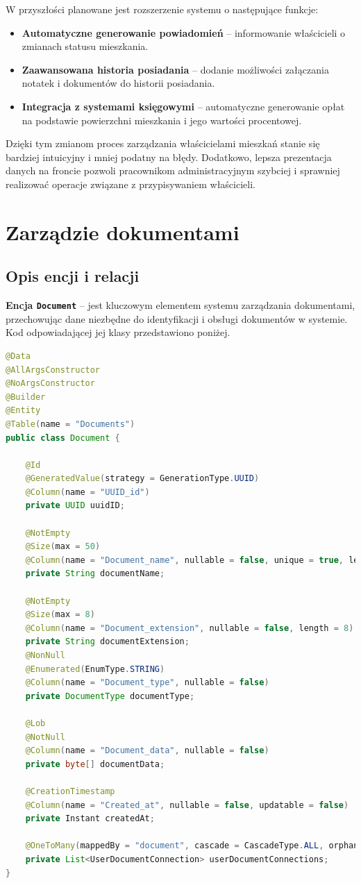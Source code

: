 W przyszłości planowane jest rozszerzenie systemu o następujące funkcje:
\begin{itemize}
    \item \textbf{Automatyczne generowanie powiadomień} -- informowanie właścicieli o zmianach statusu mieszkania.
    \item \textbf{Zaawansowana historia posiadania} -- dodanie możliwości załączania notatek i dokumentów do historii posiadania.
    \item \textbf{Integracja z systemami księgowymi} -- automatyczne generowanie opłat na podstawie powierzchni mieszkania i jego wartości procentowej.
\end{itemize}

Dzięki tym zmianom proces zarządzania właścicielami mieszkań stanie się bardziej intuicyjny i mniej podatny na błędy. Dodatkowo, lepsza prezentacja danych na froncie pozwoli pracownikom administracyjnym szybciej i sprawniej realizować operacje związane z przypisywaniem właścicieli.


\section{Zarządzie dokumentami}

\subsection{Opis encji i relacji}

\textbf{Encja \texttt{Document}}  -- jest kluczowym elementem systemu zarządzania dokumentami, przechowując dane niezbędne do identyfikacji i obsługi dokumentów w systemie. Kod odpowiadającej jej klasy przedstawiono poniżej.
\begin{lstlisting}[language=Java, style=JavaStyle, caption=Encja \texttt{Document}]
@Data
@AllArgsConstructor
@NoArgsConstructor
@Builder
@Entity
@Table(name = "Documents")
public class Document {

    @Id
    @GeneratedValue(strategy = GenerationType.UUID)
    @Column(name = "UUID_id")
    private UUID uuidID; 

    @NotEmpty
    @Size(max = 50)
    @Column(name = "Document_name", nullable = false, unique = true, length = 50)
    private String documentName; 

    @NotEmpty
    @Size(max = 8)
    @Column(name = "Document_extension", nullable = false, length = 8)
    private String documentExtension;
    @NonNull
    @Enumerated(EnumType.STRING)
    @Column(name = "Document_type", nullable = false)
    private DocumentType documentType; 

    @Lob
    @NotNull
    @Column(name = "Document_data", nullable = false)
    private byte[] documentData;

    @CreationTimestamp
    @Column(name = "Created_at", nullable = false, updatable = false)
    private Instant createdAt; 

    @OneToMany(mappedBy = "document", cascade = CascadeType.ALL, orphanRemoval = true)
    private List<UserDocumentConnection> userDocumentConnections; 
}
\end{lstlisting}

